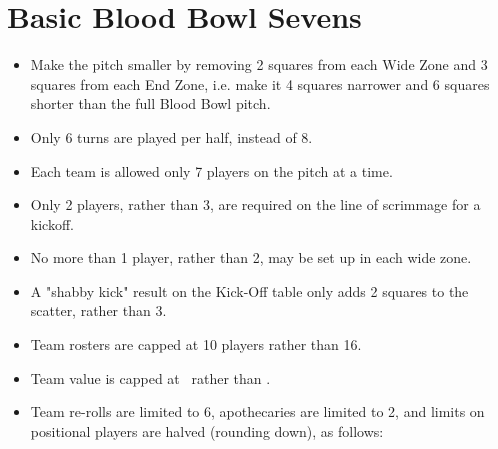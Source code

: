\section{Basic Blood Bowl Sevens}

\begin{itemize}
\item Make the pitch smaller by removing 2 squares from each Wide Zone and 3 squares from each End Zone, i.e. make it 4 squares narrower and 6 squares shorter than the full Blood Bowl pitch.
\item Only 6 turns are played per half, instead of 8.
\item Each team is allowed only 7 players on the pitch at a time.
\item Only 2 players, rather than 3, are required on the line of scrimmage for a kickoff.
\item No more than 1 player, rather than 2, may be set up in each wide zone.
\item A "shabby kick" result on the Kick-Off table only adds 2 squares to the scatter, rather than 3.
\item Team rosters are capped at 10 players rather than 16.
\item Team value is capped at \TVsevens\ rather than \TV .
\item Team re-rolls are limited to 6, apothecaries are limited to 2, and limits on positional players are halved (rounding down), as follows:
\end{itemize}

